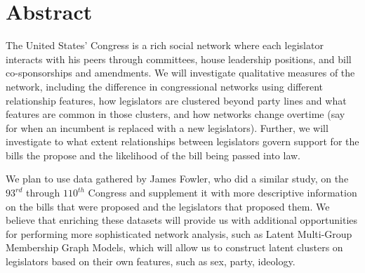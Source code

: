 \section{Abstract}

\vspace{5mm}
\noindent
The United States' Congress is a rich social network where each legislator 
interacts with his peers through committees, house leadership positions, and 
bill co-sponsorships and amendments. We will investigate qualitative measures 
of the network, including the difference in congressional networks using 
different relationship features, how legislators are clustered beyond party 
lines and what features are common in those clusters, and how networks change 
overtime (say for when an incumbent is replaced with a new legislators). 
Further, we will investigate to what extent relationships between legislators 
govern support for the bills the propose and the likelihood of the bill being 
passed into law.

\vspace{5mm}
\noindent
We plan to use data gathered by James Fowler, who did a similar study, on the 
$93^{rd}$ through $110^{th}$ Congress and supplement it with more descriptive 
information on the bills that were proposed and the legislators that proposed 
them. We believe that enriching these datasets will provide us with additional 
opportunities for performing more sophisticated network analysis, such as 
Latent Multi-Group Membership Graph Models, which will allow us to construct 
latent clusters on legislators based on their own features, such as sex, 
party, ideology.